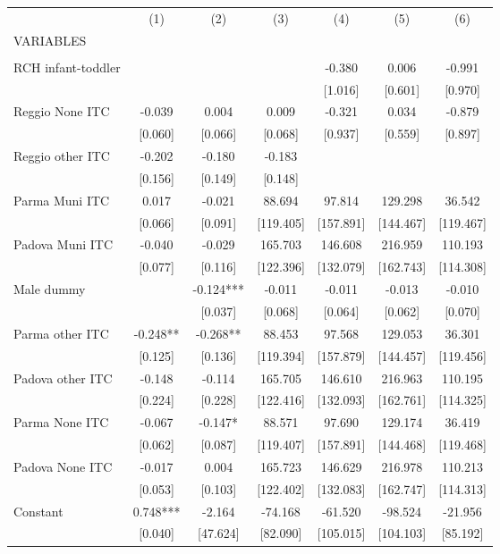 \begin{tabular}{lcccccc} \hline
 & (1) & (2) & (3) & (4) & (5) & (6) \\
VARIABLES &  &  &  &  &  &  \\ \hline
 &  &  &  &  &  &  \\
RCH infant-toddler &  &  &  & -0.380 & 0.006 & -0.991 \\
 &  &  &  & [1.016] & [0.601] & [0.970] \\
Reggio None ITC & -0.039 & 0.004 & 0.009 & -0.321 & 0.034 & -0.879 \\
 & [0.060] & [0.066] & [0.068] & [0.937] & [0.559] & [0.897] \\
Reggio other ITC & -0.202 & -0.180 & -0.183 &  &  &  \\
 & [0.156] & [0.149] & [0.148] &  &  &  \\
Parma Muni ITC & 0.017 & -0.021 & 88.694 & 97.814 & 129.298 & 36.542 \\
 & [0.066] & [0.091] & [119.405] & [157.891] & [144.467] & [119.467] \\
Padova Muni ITC & -0.040 & -0.029 & 165.703 & 146.608 & 216.959 & 110.193 \\
 & [0.077] & [0.116] & [122.396] & [132.079] & [162.743] & [114.308] \\
Male dummy &  & -0.124*** & -0.011 & -0.011 & -0.013 & -0.010 \\
 &  & [0.037] & [0.068] & [0.064] & [0.062] & [0.070] \\
Parma other ITC & -0.248** & -0.268** & 88.453 & 97.568 & 129.053 & 36.301 \\
 & [0.125] & [0.136] & [119.394] & [157.879] & [144.457] & [119.456] \\
Padova other ITC & -0.148 & -0.114 & 165.705 & 146.610 & 216.963 & 110.195 \\
 & [0.224] & [0.228] & [122.416] & [132.093] & [162.761] & [114.325] \\
Parma None ITC & -0.067 & -0.147* & 88.571 & 97.690 & 129.174 & 36.419 \\
 & [0.062] & [0.087] & [119.407] & [157.891] & [144.468] & [119.468] \\
Padova None ITC & -0.017 & 0.004 & 165.723 & 146.629 & 216.978 & 110.213 \\
 & [0.053] & [0.103] & [122.402] & [132.083] & [162.747] & [114.313] \\
Constant & 0.748*** & -2.164 & -74.168 & -61.520 & -98.524 & -21.956 \\
 & [0.040] & [47.624] & [82.090] & [105.015] & [104.103] & [85.192] \\

\end{tabular}
